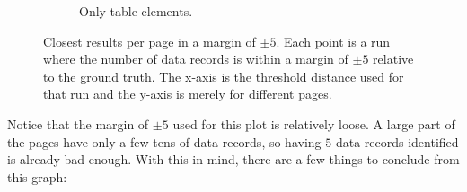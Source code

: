 \documentclass[10pt]{article}
\begin{document}
\begin{figure}[t]
\begin{subfigure}[b]{.49\textwidth}
    \end{subfigure}
    \begin{subfigure}[b]{.49\textwidth}
        
        \caption{Only table elements.}
        \label{fig:results-without-list}
        
    \end{subfigure}
    
    \caption{Closest results per page in a margin of $\pm 5$. Each point is a run where the number of data records is within a margin of $\pm 5$ relative to the ground truth. The x-axis is the threshold distance used for that run and the y-axis is merely for different pages.}
    \label{fig:results-in-margin}
    
\end{figure}


Notice that the margin of $\pm 5$ used for this plot is relatively loose. A large part of the pages have only a few tens of data records, so having $5$ data records identified is already bad enough. With this in mind, there are a few things to conclude from this graph:
\end{document}
